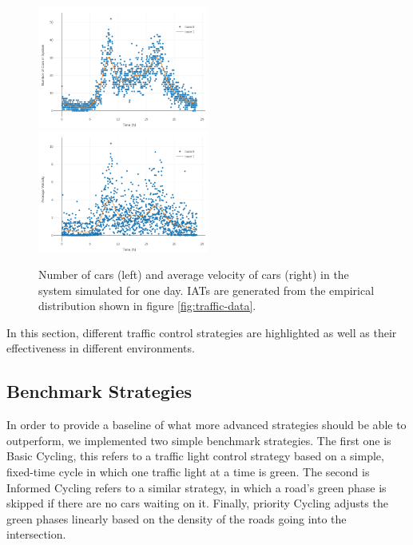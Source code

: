 \documentclass[10pt]{article}
\begin{document}
\begin{figure}[htb]
	\includegraphics[width=0.5\textwidth]{img/number_of_cars_over_day.png}
	\includegraphics[width=0.5\textwidth]{img/velocity_over_day.png}
	\caption{Number of cars (left) and average velocity of cars (right) in the system simulated for one day. IATs are generated from the empirical distribution shown in figure \ref{fig:traffic-data}. \label{fig:validation}}
\end{figure}

\label{sec:strategies}
In this section, different traffic control strategies are highlighted as well as their effectiveness in different environments.

\subsection{Benchmark Strategies} 
In order to provide a baseline of what more advanced strategies should be able to outperform, we implemented two simple benchmark strategies. The first one is Basic Cycling, this refers to a traffic light control strategy based on a simple, fixed-time cycle in which one traffic light at a time is green. The second is Informed Cycling refers to a similar strategy, in which a road's green phase is skipped if there are no cars waiting on it. 
Finally, priority Cycling adjusts the green phases linearly based on the density of the roads going into the intersection. 
\end{document}
